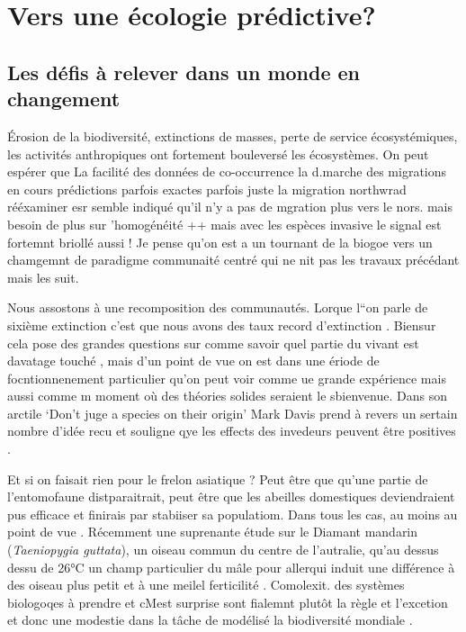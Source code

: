 \section*{Vers une écologie
prédictive?}\label{vers-une-uxe9cologie-pruxe9dictive}

\subsection*{Les défis à relever dans un monde en
changement}\label{les-duxe9fis-uxe0-relever-dans-un-monde-en-changement}

Érosion de la biodiversité, extinctions de masses, perte de service
écosystémiques, les activités anthropiques ont fortement bouleversé les
écosystèmes. On peut espérer que La facilité des données de
co-occurrence la d.marche des migrations en cours prédictions parfois
exactes parfois juste la migration northwrad rééxaminer esr semble
indiqué qu'il n'y a pas de mgration plus vers le nors. mais besoin de
plus sur 'homogénéité ++ mais avec les espèces invasive le signal est
fortemnt briollé aussi ! Je pense qu'on est a un tournant de la biogoe
vers un chamgemnt de paradigme communaité centré qui ne nit pas les
travaux précédant mais les suit.

Nous assostons à une recomposition des communautés. Lorque l``on parle
de sixième extinction c'est que nous avons des taux record d'extinction
\citep{Thomas2004}. Biensur cela pose des grandes questions sur comme
savoir quel partie du vivant est davatage touché \citep{Thuiller2011},
mais d'un point de vue on est dans une ériode de focntionnenement
particulier qu'on peut voir comme ue grande expérience mais aussi comme
m moment où des théories solides seraient le sbienvenue. Dans son
arctile `Don't juge a species on their origin' Mark Davis prend à revers
un sertain nombre d'idée recu et souligne qye les effects des invedeurs
peuvent être positives \citet{Davis2011}.

Et si on faisait rien pour le frelon asiatique ? Peut être que qu'une
partie de l'entomofaune distparaitrait, peut être que les abeilles
domestiques deviendraient pus efficace et finirais par stabiiser sa
populatiom. Dans tous les cas, au moins au point de vue
\citep{Villemant2011}. Récemment une suprenante étude sur le Diamant
mandarin (\emph{Taeniopygia guttata}), un oiseau commun du centre de
l'autralie, qu'au dessus dessu de 26°C un champ particulier du mâle pour
allerqui induit une différence à des oiseau plus petit et à une meilel
ferticilité \citep{Mariette2016}. Comolexit. des systèmes biologoqes à
prendre et cMest surprise sont fialemnt plutôt la règle et l'excetion et
donc une modestie dans la tâche de modélisé la biodiversité mondiale
\citep{Mouquet2015}.

